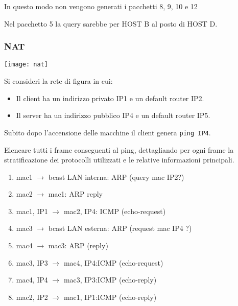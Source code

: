             In questo modo non vengono generati i pacchetti 8, 9,  10 e 12

            Nel pacchetto 5 la query sarebbe per HOST B  al posto di HOST D.

        \subsubsection{NAT}
            \problem
            \centerline{\texttt{[image: nat]}}
            Si consideri la rete di figura in cui:
            \begin{itemize}
                \item Il client ha un indirizzo privato IP1 e un default router IP2.
                \item Il server ha un indirizzo pubblico IP4 e un default router IP5.
            \end{itemize}

            Subito dopo l'accensione delle macchine il client genera \verb|ping IP4|.

            Elencare tutti i frame conseguenti al ping, dettagliando per ogni frame la stratificazione dei protocolli utilizzati e le relative informazioni principali.

            \solution
            \begin{enumerate}
                \item mac1 $\rightarrow$ bcast LAN interna: ARP (query mac IP2?)

                \item mac2 $\rightarrow$ mac1: ARP reply

                \item mac1, IP1 $\rightarrow$ mac2, IP4: ICMP (echo-request)

                \item mac3 $\rightarrow$ bcast LAN esterna: ARP (request mac IP4 ?)

                \item mac4 $\rightarrow$ mac3: ARP (reply)

                \item mac3, IP3 $\rightarrow$ mac4, IP4:ICMP (echo-request)

                \item mac4, IP4 $\rightarrow$ mac3, IP3:ICMP (echo-reply)

                \item mac2, IP2 $\rightarrow$ mac1, IP1:ICMP (echo-reply) 
            \end{enumerate}

